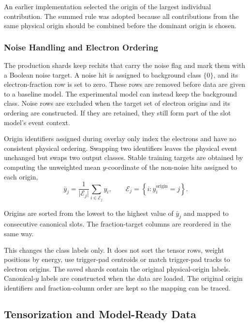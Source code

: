 An earlier implementation selected the origin of the largest individual
contribution. The summed rule was adopted because all contributions from the
same physical origin should be combined before the dominant origin is chosen.

\subsubsection{Noise Handling and Electron Ordering}

The production shards keep \gls{rechit}s that carry the noise flag and mark them
with a Boolean noise target. A noise hit is assigned to background class
\(\{0\}\), and its electron-fraction row is set to zero. These rows are removed
before data are given to a baseline model. The experimental model can instead keep
the background class. Noise rows are excluded when the target set of electron
origins and its ordering are constructed. If they are retained, they still
form part of the slot model's event context.

Origin identifiers assigned during overlay only index the electrons and have
no consistent physical ordering. Swapping two identifiers leaves the physical
event unchanged but swaps two output classes. Stable training targets are
obtained by computing the unweighted mean \(y\)-coordinate of the non-noise
hits assigned to each origin,
\begin{equation}
    \bar y_j =
    \frac{1}{\lvert \mathcal{E}_j\rvert}
    \sum_{i\in\mathcal{E}_j} y_i,
    \qquad
    \mathcal{E}_j =
    \left\{i:y_i^{\mathrm{origin}}=j\right\}.
\end{equation}

Origins are sorted from the lowest to the highest value of \(\bar y_j\) and
mapped to consecutive canonical slots. The fraction-target columns are
reordered in the same way.

This changes the class labels only. It does not sort the tensor rows, weight
positions by energy, use trigger-pad centroids or match trigger-pad tracks to
electron origins. The saved shards contain the original physical-origin
labels. Canonical-\(y\) labels are constructed when the data are loaded. The
original origin identifiers and fraction-column order are kept so the mapping
can be traced.

\subsection{Tensorization and Model-Ready Data}
\label{sec:method_features}

